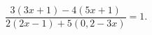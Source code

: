 \begin{ex}[type=equation]
	\begin{condition}
		 $\dfrac{3(3x+1)-4(5x + 1)}{2(2x-1)+5(0,2 - 3x)} = 1.$
	\end{condition}
\end{ex}